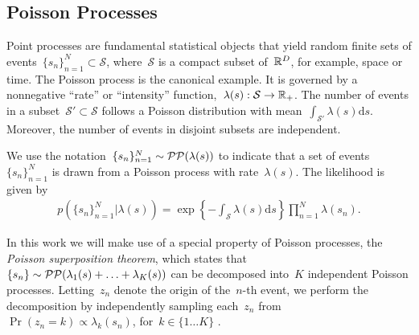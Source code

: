 \subsection{Poisson Processes}
Point processes are fundamental statistical objects that yield random finite sets of events~${\{s_n\}_{n=1}^N \subset \mathcal{S}}$, where~$\mathcal{S}$ is a compact subset of~${\mathbb{R}^D}$, for example, space or time. The Poisson process is the canonical example. It is governed by a nonnegative ``rate'' or  ``intensity'' function,~${\lambda(s): \mathcal{S}\rightarrow\mathbb{R}_+}$. The number of events in a subset~${\mathcal{S}'\subset\mathcal{S}}$ follows a Poisson distribution with mean~${\int_{\mathcal{S}'}\lambda(s)\mathrm{d}s}$. Moreover, the number of events in disjoint subsets are independent. 

We use the notation~${\{s_n\}_{n=1}^N\sim\mathcal{PP}(\lambda(s))}$ to indicate that a set of events~$\{s_n\}_{n=1}^N$ is drawn from a Poisson process with rate~$\lambda(s)$. The likelihood is given by
\begin{align}
\label{eq:poisson_lkhd}
p(\{s_n\}_{n=1}^N|\lambda(s))=\exp\left\{-\!\int_{\mathcal{S}}\!\lambda(s)\mathrm{d}s\right\}\prod_{n=1}^N\lambda(s_n).
\end{align}

In this work we will make use of a special property of Poisson processes, the \emph{Poisson superposition theorem}, which states that ~${\{s_n\}\sim\mathcal{PP}(\lambda_1(s)+\ldots+\lambda_K(s))}$ can be decomposed into~$K$ independent Poisson processes. Letting~${z_n}$ denote the origin of the~$n$-th event, we perform the decomposition by independently sampling each~${z_n}$ from~${\Pr(z_n=k)\propto\lambda_k(s_n)}$, for~${k\in\{1\ldots K\}}$ \cite{Daley-1988}. 


